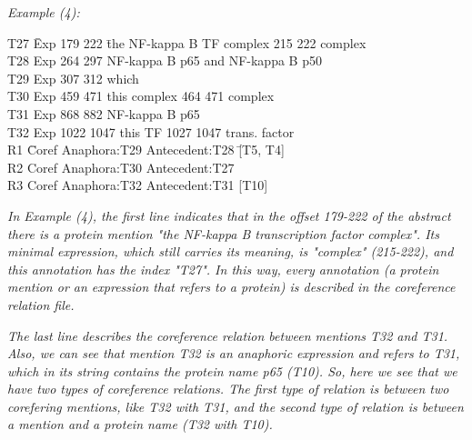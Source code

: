 \emph{Example (4)\footnotemark :}
{\selectfont
	\begin{tabbing}
		{\small T27} \= {\small Exp 179 222}\hspace{3mm} \= {\small the NF-kappa B TF complex} {\small 215 222 complex} \\
		{\small T28} \> {\small Exp 264 297} \> {\small NF-kappa B p65 and NF-kappa B p50}\\
		{\small T29} \> {\small Exp 307 312} \> {\small which}\\
		{\small T30} \> {\small Exp 459 471} \> {\small this complex} \hspace{2mm}   {\small 464 471 complex} \\
		{\small T31} \> {\small Exp 868 882} \> {\small NF-kappa B p65}\\
		{\small T32} \> {\small Exp 1022 1047} \> {\small this TF   1027 1047  trans. factor}\\
		{\small R1}  \hspace{5mm} \=  {\small Coref Anaphora:T29 Antecedent:T28}  \hspace{5mm}  \= {\small [T5, T4]}\\
		{\small R2} \>  {\small Coref Anaphora:T30 Antecedent:T27}\\
		{\small R3} \>  {\small Coref Anaphora:T32 Antecedent:T31}  \>  {\small [T10]}\\
	\end{tabbing}
}
\vspace{5mm} 

\emph{In Example (4), the first line indicates that in the offset 179-222 of the abstract there is a protein mention "the NF-kappa B transcription factor complex". Its minimal expression, which still carries its meaning, is "complex" (215-222), and this annotation has the index "T27". In this way, every annotation (a protein mention or an expression that refers to a protein) is described in the coreference relation file.}

\emph{The last line describes the coreference relation between mentions T32 and T31. Also, we can see that mention T32 is an anaphoric expression and refers to T31, which in its string contains the protein name \emph{p65} (\emph{T10}). So, here we see that we have two types of coreference relations. The first type of relation is between two corefering mentions, like T32 with T31, and the second type of relation is between a mention and a protein name (T32 with T10).}

